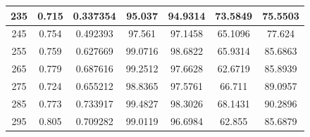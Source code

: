 \begin{appendices}
\begin{table}
\begin{tabular}{ |c|c|c|c|c|c|c| }
\hline
235 &  0.715 &  0.337354 &  95.037 &  94.9314 &  73.5849 &  75.5503 \\
\hline
245 &  0.754 &  0.492393 &  97.561 &  97.1458 &  65.1096 &  77.624 \\
\hline
255 &  0.759 &  0.627669 &  99.0716 &  98.6822 &  65.9314 &  85.6863 \\
\hline
265 &  0.779 &  0.687616 &  99.2512 &  97.6628 &  62.6719 &  85.8939 \\
\hline
275 &  0.724 &  0.655212 &  98.8365 &  97.5761 &  66.711 &  89.0957 \\
\hline
285 &  0.773 &  0.733917 &  99.4827 &  98.3026 &  68.1431 &  90.2896 \\
\hline
295 &  0.805 &  0.709282 &  99.0119 &  96.6984 &  62.855 &  85.6879 \\
\hline
\end{tabular}

\end{table}


\end{appendices}
